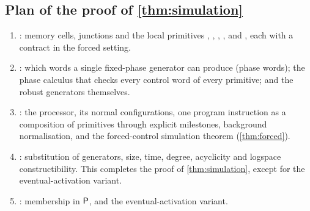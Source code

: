 \subsection{Plan of the proof of \texorpdfstring{\cref{thm:simulation}}{the simulation theorem}}

\begin{enumerate}[label=(\arabic*)]
\item {}: memory cells, junctions and the local primitives , ,
  , ,  and , each with a contract in the forced setting.
\item {}: which words a single fixed-phase generator can produce (phase words); the
  phase calculus that checks every control word of every primitive; and the robust generators
  themselves.
\item {}: the processor, its normal configurations, one program instruction as a
  composition of primitives through explicit milestones, background normalisation, and the
  forced-control simulation theorem (\cref{thm:forced}).
\item {}: substitution of generators, size, time, degree, acyclicity and logspace
  constructibility. This completes the proof of \cref{thm:simulation}, except for the
  eventual-activation variant.
\item {}: membership in $\mathsf{P}$, and the eventual-activation variant.
\end{enumerate}
